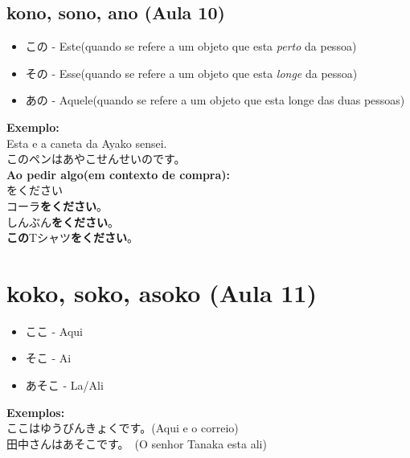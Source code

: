 \documentclass[a4paper, 12pt]{article}
\begin{document}
\subsection{kono, sono, ano (Aula 10)}
\begin{CJK}{UTF8}{min}
	\begin{itemize}
		\item この - Este(quando se refere a um objeto que esta \textit{perto} da pessoa)\\
		\item その - Esse(quando se refere a um objeto que esta \textit{longe} da pessoa)\\
		\item あの - Aquele(quando se refere a um objeto que esta longe das duas pessoas)\\
	\end{itemize}

	\textbf{Exemplo:}\\
	Esta e a caneta da Ayako sensei.\\
	このペンはあやこせんせいのです。	\\
	
	\textbf{Ao pedir algo(em contexto de compra):}\\
	をください\\
	コーラ\textbf{をください}。\\
	しんぶん\textbf{をください}。\\
	\textbf{この}Tシャツ\textbf{をください}。\\
	
\end{CJK}
	
\section{koko, soko, asoko (Aula 11)}	
\begin{CJK}{UTF8}{min}
	\begin{itemize}
		\item ここ - Aqui\\
		\item そこ - Ai\\
		\item あそこ - La/Ali\\
	\end{itemize}

	\textbf{Exemplos:}\\
	ここはゆうびんきょくです。(Aqui e o correio)\\
	田中さんはあそこです。　(O senhor Tanaka esta ali)\\
\end{CJK}
\end{document}
